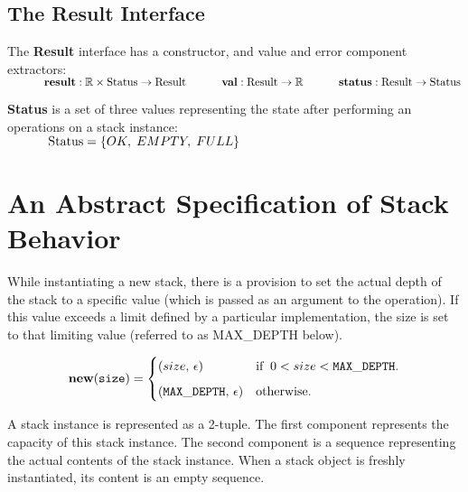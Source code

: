 \documentclass[10pt]{article}
\begin{document}
\subsection{The Result Interface}
  The \textbf{Result} interface has a constructor, and value and error component extractors:
  \vspace*{6pt}\\\(
  \hspace*{32pt}\textbf{result}: \mathbb{R} \times \mathrm{Status} \rightarrow \mathrm{Result}\vspace*{4pt}\\
  \hspace*{32pt}\textbf{val}: \mathrm{Result} \rightarrow \mathbb{R}\vspace*{4pt}\\
  \hspace*{32pt}\textbf{status}: \mathrm{Result} \rightarrow \mathrm{Status}
  \)\vspace*{6pt}  
  
  \textbf{Status} is a set of three values representing the state after performing an operations on a stack instance: 
   \vspace*{6pt}\\\(\hspace*{32pt}\mathrm{Status} = \{OK, \; EMPTY, \; FULL\} \)

  \section{An Abstract Specification of Stack Behavior}
    While instantiating a new stack, there is a provision to set the actual depth of the stack to a specific value (which is passed as an argument to the operation). If this value exceeds a limit defined by a particular implementation, the size is set to that limiting value (referred to as MAX\_DEPTH below).

    \[
        \mathtt{\mathbf{new}(size)} = \begin{cases} (size, \,  \epsilon) &\mbox{if\;\;} 0 < size < \mathtt{MAX\_DEPTH}. \vspace*{6pt}\\ 
        (\mathtt{MAX\_DEPTH}, \, \epsilon) & \mbox{otherwise}. \end{cases} 
    \]
    
    A stack instance is represented as a 2-tuple. The first component represents the capacity of this stack instance. The second component is a sequence representing the actual contents of the stack instance. When a stack object is freshly instantiated, its content is an empty sequence. 
\end{document}
